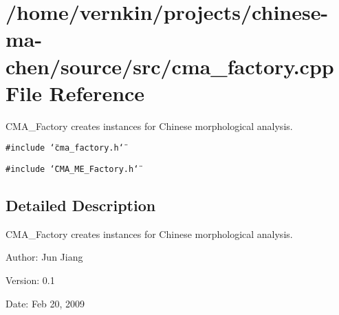 \section{/home/vernkin/projects/chinese-ma-chen/source/src/cma\_\-factory.cpp File Reference}
\label{cma__factory_8cpp}
CMA\_\-Factory creates instances for Chinese morphological analysis.  


{\tt \#include \char`\"{}cma\_\-factory.h\char`\"{}}\par
{\tt \#include \char`\"{}CMA\_\-ME\_\-Factory.h\char`\"{}}\par


\subsection{Detailed Description}
CMA\_\-Factory creates instances for Chinese morphological analysis. 

\begin{Desc}
\item[Author:]Jun Jiang \end{Desc}
\begin{Desc}
\item[Version:]0.1 \end{Desc}
\begin{Desc}
\item[Date:]Feb 20, 2009 \end{Desc}
